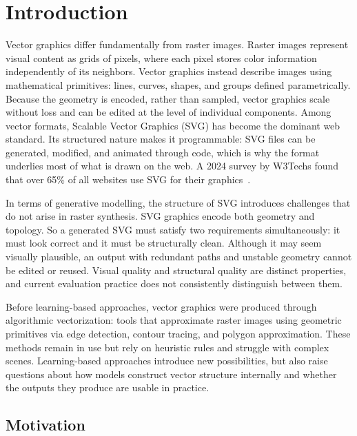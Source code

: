 \chapter{Introduction}
\label{ch:Introduction}

Vector graphics differ fundamentally from raster images.
Raster images represent visual content as grids of pixels, 
where each pixel stores color information independently of its neighbors. 
Vector graphics instead describe images using mathematical primitives: 
lines, curves, shapes, and groups defined parametrically. 
Because the geometry is encoded, rather than sampled, vector graphics scale without loss 
and can be edited at the level of individual components. 
Among vector formats, Scalable Vector Graphics (SVG) has become 
the dominant web standard. Its structured nature makes it programmable: 
SVG files can be generated, modified, and animated through code, 
which is why the format underlies most of what is drawn on the web. 
A 2024 survey by W3Techs found that over 65\% of all websites use SVG for their graphics~\cite{w3techsSVG2024}.

In terms of generative modelling,
the structure of SVG introduces challenges that do not arise in raster synthesis.
SVG graphics encode both geometry and topology. 
So a generated SVG must satisfy two requirements simultaneously: 
it must look correct and it must be structurally clean. 
Although it may seem visually plausible, an output with redundant paths 
and unstable geometry cannot be edited or reused. 
Visual quality and structural quality are distinct properties, 
and current evaluation practice does not consistently distinguish between them.

Before learning-based approaches, vector graphics were 
produced through algorithmic vectorization: tools that 
approximate raster images using geometric primitives 
via edge detection, contour tracing, and polygon 
approximation. These methods remain in use 
but rely on heuristic rules and struggle with complex 
scenes. Learning-based approaches introduce new 
possibilities, but also raise questions about how 
models construct vector structure internally and 
whether the outputs they produce are usable in practice.


\section{Motivation}
\label{sec:motivation}

